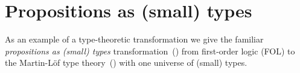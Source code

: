 \chapter{Propositions as (small) types}

As an example of a type-theoretic transformation we give the familiar \emph{propositions as (small) types} transformation~() from first-order logic (FOL) to the Martin-Löf type theory~() with one universe of (small) types.


